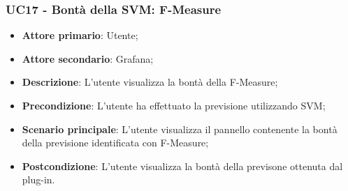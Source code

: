 \subsubsection{UC17 - Bontà della SVM: F-Measure}
\label{sssec:uc17}
\begin{itemize}
  \item \textbf{Attore primario}: Utente;
  \item \textbf{Attore secondario}: Grafana;
  \item \textbf{Descrizione}: L'utente visualizza la bontà della F-Measure;
  \item \textbf{Precondizione}: L'utente ha effettuato la previsione utilizzando SVM;
  \item \textbf{Scenario principale}: L'utente visualizza il pannello contenente la bontà della previsione identificata con F-Measure;
  \item \textbf{Postcondizione}: L'utente visualizza la bontà della previsone ottenuta dal plug-in.
\end{itemize}
